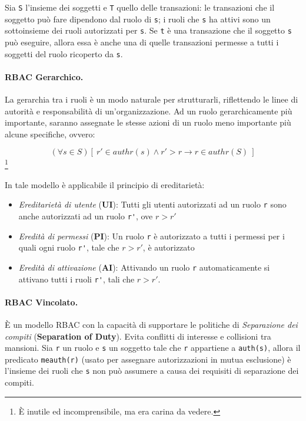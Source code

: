 Sia \verb|S| l'insieme dei soggetti e \verb|T| quello delle transazioni:
le transazioni che il soggetto può fare
dipendono dal ruolo di \verb|s|; i ruoli che \verb|s| ha attivi sono un
sottoinsieme dei ruoli autorizzati per \verb|s|.
Se \verb|t| è una transazione che il soggetto \verb|s| può eseguire, allora essa
è anche una di quelle transazioni permesse a tutti i soggetti del ruolo
ricoperto da \verb|s|.

\paragraph{RBAC Gerarchico.}
La gerarchia tra i ruoli è un modo naturale per strutturarli, riflettendo le
linee di autorità e responsabilità di un'organizzazione. Ad un ruolo
gerarchicamente più importante, saranno assegnate le stesse azioni di un ruolo
meno importante più alcune specifiche, ovvero:

\[
      (\forall s \in S)[ \ r' \in authr(s) \wedge r' > r \rightarrow r \in authr(S) \ ]
\]\footnote{È inutile ed incomprensibile, ma era carina da vedere.}

In tale modello è applicabile il principio di ereditarietà:

\begin{itemize}
      \item \textit{Ereditarietà di utente} (\textbf{UI}): Tutti gli utenti
            autorizzati ad un ruolo \verb|r| sono anche autorizzati ad
            un ruolo \verb|r'|, ove \(r > r'\)
      \item \textit{Eredità di permessi} (\textbf{PI}): Un ruolo \verb|r| è
            autorizzato a tutti i permessi per i quali ogni ruolo \verb|r'|,
            tale che \(r > r'\), è autorizzato
      \item \textit{Eredità di attivazione} (\textbf{AI}): Attivando un
            ruolo \verb|r| automaticamente si attivano tutti i ruoli \verb|r'|,
            tali che \(r > r'\).
\end{itemize}

\paragraph{RBAC Vincolato.}
È un modello RBAC con la capacità di supportare le politiche di
\textit{Separazione dei compiti}
(\textbf{Separation of Duty}). Evita conflitti di interesse e collisioni tra
mansioni.
Sia \verb|r| un ruolo e \verb|s| un soggetto tale che \verb|r|
appartiene a \verb|auth(s)|, allora il predicato
\verb|meauth(r)| (usato per assegnare autorizzazioni in mutua esclusione) è
l'insieme dei ruoli che \verb|s| non può assumere a
causa dei requisiti di separazione dei
compiti.

